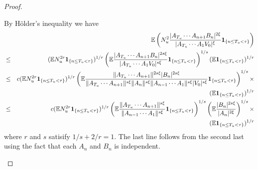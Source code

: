 \documentclass{article}
\theoremstyle{remark}
\begin{document}
\begin{proof}
\begin{enumerate}
      By H\"older's inequality we have
      \begin{eqnarray*}
        &&
        \mathbb{E} \left(
          N_u^2
          \frac{
            |A_{T_u} \cdots A_{n+1} B_n|^{2\xi}
          }{
            |A_{T_u} \cdots A_1 V_0|^\xi
          }
          \mathbf{1}_{\{n \leq T_u < \tau\}}
        \right) \\
        &\leq&
        (\mathbb{E} N_u^{2r}\mathbf{1}_{\{n \leq T_u < \tau\}})^{1/r}
        \left(
          \mathbb{E} {
            |A_{T_u} \cdots A_{n+1} B_n|^{2s \xi}
            \over
            |A_{T_u} \cdots A_1 V_0|^{s \xi}
          } \mathbf{1}_{\{n \leq T_u < \tau\}}
        \right)^{1/s}
        (\mathbb{E} \mathbf{1}_{\{n \leq T_u < \tau\}})^{1/r} \\
        &\leq&
        c
        (\mathbb{E} N_u^{2r}\mathbf{1}_{\{n \leq T_u < \tau\}})^{1/r}
        \left(
          \mathbb{E} {
            \|A_{T_u} \cdots A_{n+1} \|^{2s\xi} |B_n|^{2s \xi}
            \over
            \|A_{T_u} \cdots A_{n+1} \|^{s\xi} \|A_n\|^{s\xi}
            \|A_{n-1} \cdots A_1\|^{s\xi} |V_0|^{s \xi}
          } \mathbf{1}_{\{n \leq T_u < \tau\}}
        \right)^{1/s} \times \\
        &&
        (\mathbb{E} \mathbf{1}_{\{n \leq T_u < \tau\}})^{1/r} \\
        &\leq&
        c
        (\mathbb{E} N_u^{2r}\mathbf{1}_{\{n \leq T_u < \tau\}})^{1/r}
        \left(
          \mathbb{E} {
            \|A_{T_u} \cdots A_{n+1} \|^{s\xi}
            \over
            \|A_{n-1} \cdots A_1\|^{s\xi}
         }
         \mathbf{1}_{\{n \leq T_u < \tau\}}
          \right)^{1/s}         
          \left(
          \mathbb{E} {
            |B_n|^{2s\xi}
            \over
            |A_n|^{2\xi}
          }
        \right)^{1/s} \times \\
        &&
        (\mathbb{E} \mathbf{1}_{\{n \leq T_u < \tau\}})^{1/r}
      \end{eqnarray*}
      where $r$ and $s$ satisify $1/s + 2/r = 1$.
      The last line follows from the second last using the fact that
      each $A_n$ and $B_n$ is independent.
      

\end{enumerate}
\end{proof}
\end{document}
